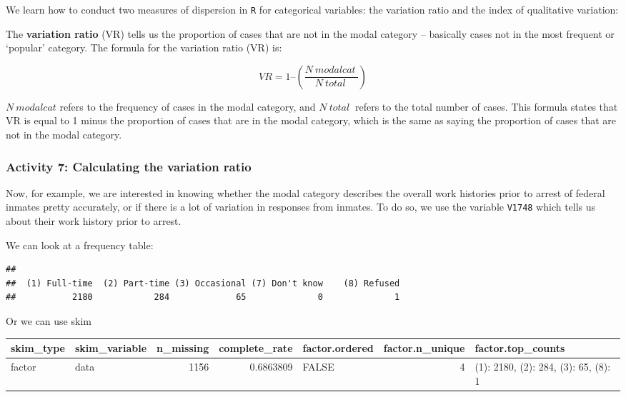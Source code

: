 \documentclass[
]{book}
\newenvironment{Shaded}{\begin{snugshade}}{\end{snugshade}}
\newcommand{\FunctionTok}[1]{\textcolor[rgb]{0.00,0.00,0.00}{#1}}
\newcommand{\NormalTok}[1]{#1}
\newcommand{\SpecialCharTok}[1]{\textcolor[rgb]{0.00,0.00,0.00}{#1}}
\begin{document}
We learn how to conduct two measures of dispersion in \texttt{R} for categorical variables: the variation ratio and the index of qualitative variation:

The \textbf{variation ratio} (VR) tells us the proportion of cases that are not in the modal category -- basically cases not in the most frequent or `popular' category. The formula for the variation ratio (VR) is:

\[VR = 1 – ({\frac {N~modalcat~} {N~total~}})\]

\(N~modalcat\) refers to the frequency of cases in the modal category, and \(N~total~\) refers to the total number of cases. This formula states that VR is equal to 1 minus the proportion of cases that are in the modal category, which is the same as saying the proportion of cases that are not in the modal category.

\hypertarget{activity-7-calculating-the-variation-ratio}{%
\subsubsection{Activity 7: Calculating the variation ratio}\label{activity-7-calculating-the-variation-ratio}}

Now, for example, we are interested in knowing whether the modal category describes the overall work histories prior to arrest of federal inmates pretty accurately, or if there is a lot of variation in responses from inmates. To do so, we use the variable \texttt{V1748} which tells us about their work history prior to arrest.

We can look at a frequency table:

\begin{Shaded}
\end{Shaded}

\begin{verbatim}
## 
##  (1) Full-time  (2) Part-time (3) Occasional (7) Don't know    (8) Refused 
##           2180            284             65              0              1
\end{verbatim}

Or we can use skim

\begin{tabular}{l|l|r|r|l|r|l}
\hline
skim\_type & skim\_variable & n\_missing & complete\_rate & factor.ordered & factor.n\_unique & factor.top\_counts\\
\hline
factor & data & 1156 & 0.6863809 & FALSE & 4 & (1): 2180, (2): 284, (3): 65, (8): 1\\
\hline
\end{tabular}
\end{document}

